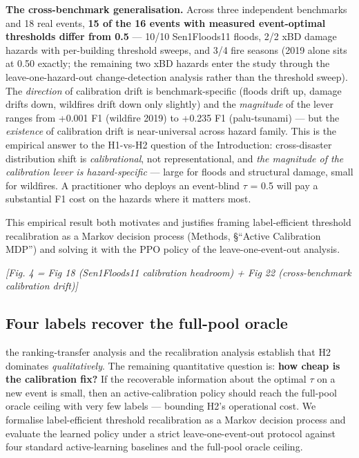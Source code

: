 \textbf{The cross-benchmark generalisation.} Across three independent
benchmarks and 18 real events, \textbf{15 of the 16 events with measured
event-optimal thresholds differ from 0.5} --- 10/10 Sen1Floods11 floods,
2/2 xBD damage hazards with per-building threshold sweeps, and 3/4 fire
seasons (2019 alone sits at 0.50 exactly; the remaining two xBD hazards
enter the study through the leave-one-hazard-out change-detection
analysis rather than the threshold sweep).
The \emph{direction} of calibration drift is benchmark-specific (floods drift
up, damage drifts down, wildfires drift down only slightly) and the
\emph{magnitude} of the lever ranges from +0.001 F1 (wildfire 2019) to
+0.235 F1 (palu-tsunami) --- but the \emph{existence} of calibration drift is
near-universal across hazard family. This is the empirical answer to
the H1-vs-H2 question of the Introduction: cross-disaster distribution
shift is \emph{calibrational}, not representational, and \emph{the magnitude of
the calibration lever is hazard-specific} --- large for floods and
structural damage, small for wildfires. A practitioner who deploys an
event-blind $\tau$ = 0.5 will pay a substantial F1 cost on the hazards
where it matters most.

This empirical result both motivates and justifies framing label-efficient
threshold recalibration as a Markov decision process (Methods, \S{}``Active
Calibration MDP'') and solving it with the PPO policy of the leave-one-event-out analysis.

\emph{{[}Fig. 4 = Fig 18 (Sen1Floods11 calibration headroom) + Fig 22
(cross-benchmark calibration drift){]}}

\subsection{Four labels recover the full-pool oracle}\label{four-labels-recover-the-full-pool-oracle}

the ranking-transfer analysis and the recalibration analysis establish that H2 dominates \emph{qualitatively}. The remaining
quantitative question is: \textbf{how cheap is the calibration fix?} If the
recoverable information about the optimal $\tau$ on a new event is small,
then an active-calibration policy should reach the full-pool oracle
ceiling with very few labels --- bounding H2's operational cost. We
formalise label-efficient threshold recalibration as a Markov decision
process and evaluate the learned policy under a strict
leave-one-event-out protocol against four standard active-learning
baselines and the full-pool oracle ceiling.

